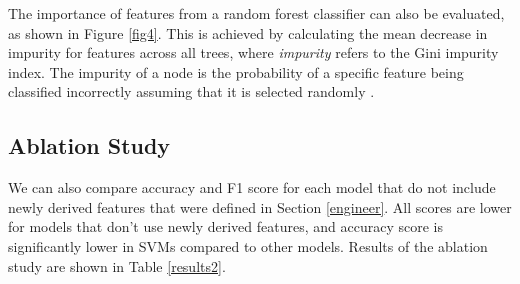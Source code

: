The importance of features from a random forest classifier can also be evaluated, as shown in Figure \ref{fig4}. This is achieved by calculating the mean decrease in impurity for features across all trees, where \textit{impurity} refers to the Gini impurity index. The impurity of a node is the probability of a specific feature being classified incorrectly assuming that it is selected randomly \cite{cassidy2014calculating}.


\subsection{Ablation Study}
We can also compare accuracy and F1 score for each model that do not include newly derived features that were defined in Section \ref{engineer}. All scores are lower for models that don't use newly derived features, and accuracy score is significantly lower in SVMs compared to other models. Results of the ablation study are shown in Table \ref{results2}.

\begin{table}[ht]
\caption{Model performance with and without newly derived features}
\label{results2}
\centering
\setlength{\tabcolsep}{8pt}
\end{table}